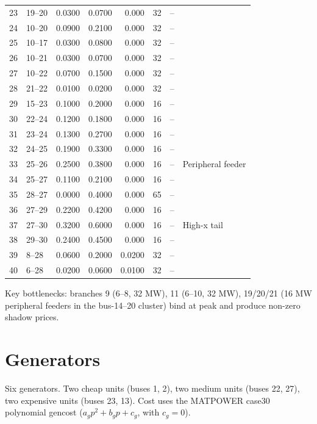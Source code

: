 \documentclass[11pt,a4paper]{article}
\begin{document}
\begin{tabular}{@{}rllrrrrl@{}}
23 & 19--20 & 0.0300 & 0.0700 & 0.000  &  32 & -- & \\
24 & 10--20 & 0.0900 & 0.2100 & 0.000  &  32 & -- & \\
25 & 10--17 & 0.0300 & 0.0800 & 0.000  &  32 & -- & \\
26 & 10--21 & 0.0300 & 0.0700 & 0.000  &  32 & -- & \\
27 & 10--22 & 0.0700 & 0.1500 & 0.000  &  32 & -- & \\
28 & 21--22 & 0.0100 & 0.0200 & 0.000  &  32 & -- & \\
29 & 15--23 & 0.1000 & 0.2000 & 0.000  &  16 & -- & \\
30 & 22--24 & 0.1200 & 0.1800 & 0.000  &  16 & -- & \\
31 & 23--24 & 0.1300 & 0.2700 & 0.000  &  16 & -- & \\
32 & 24--25 & 0.1900 & 0.3300 & 0.000  &  16 & -- & \\
33 & 25--26 & 0.2500 & 0.3800 & 0.000  &  16 & -- & Peripheral feeder \\
34 & 25--27 & 0.1100 & 0.2100 & 0.000  &  16 & -- & \\
35 & 28--27 & 0.0000 & 0.4000 & 0.000  &  65 & -- & \\
36 & 27--29 & 0.2200 & 0.4200 & 0.000  &  16 & -- & \\
37 & 27--30 & 0.3200 & 0.6000 & 0.000  &  16 & -- & High-x tail \\
38 & 29--30 & 0.2400 & 0.4500 & 0.000  &  16 & -- & \\
39 & 8--28  & 0.0600 & 0.2000 & 0.0200 &  32 & -- & \\
40 & 6--28  & 0.0200 & 0.0600 & 0.0100 &  32 & -- & \\
\bottomrule
\end{tabular}

Key bottlenecks: branches 9 (6--8, 32 MW), 11 (6--10, 32 MW), 19/20/21 (16 MW peripheral
feeders in the bus-14--20 cluster) bind at peak and produce non-zero shadow prices.

\section{Generators}

Six generators. Two cheap units (buses 1, 2), two medium units (buses 22, 27), two expensive
units (buses 23, 13). Cost uses the MATPOWER case30 polynomial gencost
($a_g p^2 + b_g p + c_g$, with $c_g = 0$).
\end{document}
